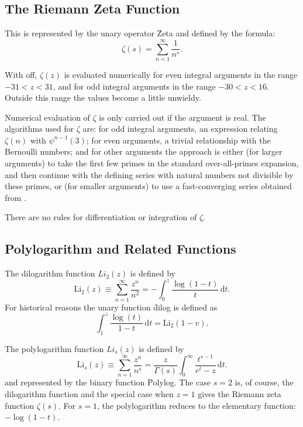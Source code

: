 \subsection{The Riemann Zeta Function}
\hypertarget{operator:ZETA}{}
\hypertarget{RIEMZETA}{}
%
This is represented by the unary operator \f{Zeta} and defined by the
formula:
\[\zeta(s) = \sum_{n=1}^\infty \frac{1}{n^s}.\]

With  off, $\zeta(z)$ is evaluated numerically for even
integral arguments in the range $-31 < z < 31$, and for odd integral
arguments in the range $-30 < z < 16$.  Outside this range the values
become a little unwieldy.

Numerical evaluation of $\zeta$ is only carried out if the argument is real.
The algorithms used for $\zeta$ are: for odd integral arguments, an
expression relating $\zeta(n)$ with $\psi^{n-1}(3)$; for even arguments, a
trivial relationship with the Bernoulli numbers; and for other arguments the
approach is either (for larger arguments) to take the first few primes in
the standard over-all-primes expansion, and then continue with the defining
series with natural numbers not divisible by these primes, or (for smaller
arguments) to use a fast-converging series obtained from \cite{BenderOrszag:78}.

There are no rules for differentiation or integration of $\zeta$.

\subsection{Polylogarithm and Related Functions}
\hypertarget{operator:LERCH_PHI}{}
\hypertarget{POLYLOG}{}
 
The dilogarithm function $Li_2(z)$ is defined by
\[\mathrm{Li}_2(z) \equiv \sum_{n=1}^\infty \frac{z^n}{n^2} =
  -\int_0^z \frac{\log(1-t)}{t}\, \mathrm{d}t.\]
For historical reasons the unary function \f{dilog} is defined as
\[  \int_1^z \frac{\log(t)}{1-t}\, \mathrm{d}t = \mathrm{Li}_2(1-v).\]

The polylogarithm function $Li_s(z)$ is defined by
\[\mathrm{Li}_s(z) \equiv \sum_{n=1}^\infty \frac{z^n}{n^s} =
\frac{z}{\Gamma(s)} \int_0^\infty \frac{t^{s-1}}{e^t-z}\, \mathrm{d}t.\]
and represented by the binary function \f{Polylog}.
The case $s=2$ is, of course, the dilogarithm function and the special case
when $z=1$ gives the Riemann zeta function $\zeta(s)$. For $s=1$, the
polylogarithm reduces to the elementary function: $-\log(1-t)$.

